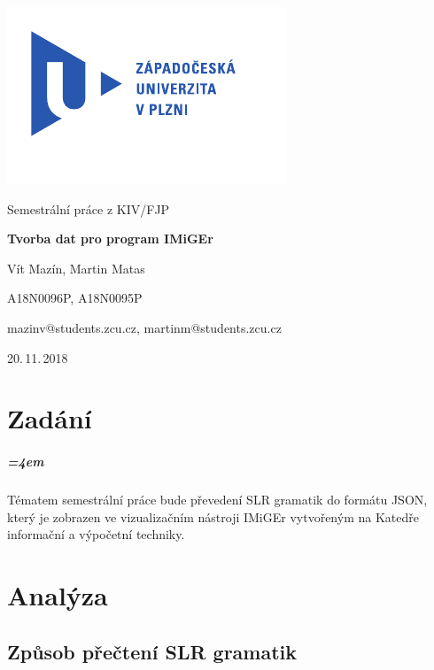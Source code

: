 \documentclass[
12pt,
a4paper,
pdftex,
czech,
titlepage
]{report}
\begin{document}
\begin{titlepage}
	\vspace*{-2cm}
	{\centering\includegraphics[scale=1.0]{logo.pdf}\par}
	\centering
	\vspace*{2cm}
	{\Large Semestrální práce z KIV/FJP\par}
	\vspace{1.5cm}
	{\Huge\bfseries Tvorba dat pro program IMiGEr\par}
	\vspace{2cm}

	{\Large Vít Mazín, Martin Matas\par}
	{\Large A18N0096P, A18N0095P\par}
	{\Large mazinv@students.zcu.cz, martinm@students.zcu.cz\par}

	\vfill

	{\Large 20.\,11.\,2018}
\end{titlepage}

\tableofcontents
\thispagestyle{empty}
\clearpage

\chapter{Zadání}
\setcounter{page}{1}
\paragraph{\parindent=4em}{
Tématem semestrální práce bude převedení SLR gramatik do formátu JSON, který je zobrazen ve vizualizačním nástroji IMiGEr vytvořeným na Katedře informační a výpočetní techniky.
}

\chapter{Analýza}
\section{Způsob přečtení SLR gramatik}
\end{document}

